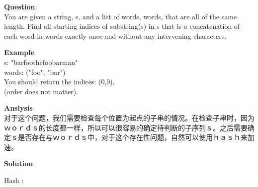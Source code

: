     
\begin{description}
    \item{\textbf{Question}}:\\%
		You are given a string, s, and a list of words, words, that are all of the same length. Find all starting indices of substring(s) in s that is a concatenation of each word in words exactly once and without any intervening characters.\\

    \item{\textbf{Example}}\\
		s: "barfoothefoobarman"\\
		words: ("foo", "bar")\\
		You should return the indices: (0,9).\\
		(order does not matter).\\

    \item{\textbf{Anslysis}}\\
		对于这个问题，我们需要检查每个位置为起点的子串的情况。在检查子串时，因为ｗｏｒｄｓ的长度都一样，所以可以很容易的确定待判断的子序列ｓ。之后需要确定ｓ是否存在与ｗｏｒｄｓ中，对于这个存在性问题，自然可以使用ｈａｓｈ来加速。\\

    \item{\textbf{Solution}}\\
	\item{Hash} : \\
		\begin{lstlisting}
		\end{lstlisting}

\end{description}

